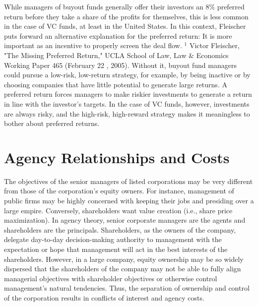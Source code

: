\documentclass[11pt]{article}
\begin{document}
While managers of buyout funds generally offer their investors an $8 \%$ preferred return before they take a share of the profits for themselves, this is less common in the case of VC funds, at least in the United States. In this context, Fleischer puts forward an alternative explanation for the preferred return: It is more important as an incentive to properly screen the deal flow. ${ }^{1}$ Victor Fleischer, "The Missing Preferred Return," UCLA School of Law, Law \& Economics Working Paper 465 (February 22 , 2005). Without it, buyout fund managers could pursue a low-risk, low-return strategy, for example, by being inactive or by choosing companies that have little potential to generate large returns. A preferred return forces managers to make riskier investments to generate a return in line with the investor's targets. In the case of VC funds, however, investments are always risky, and the high-risk, high-reward strategy makes it meaningless to bother about preferred returns.

\section*{Agency Relationships and Costs}
The objectives of the senior managers of listed corporations may be very different from those of the corporation's equity owners. For instance, management of public firms may be highly concerned with keeping their jobs and presiding over a large empire. Conversely, shareholders want value creation (i.e., share price maximization). In agency theory, senior corporate managers are the agents and shareholders are the principals. Shareholders, as the owners of the company, delegate day-to-day decision-making authority to management with the expectation or hope that management will act in the best interests of the shareholders. However, in a large company, equity ownership may be so widely dispersed that the shareholders of the company may not be able to fully align managerial objectives with shareholder objectives or otherwise control management's natural tendencies. Thus, the separation of ownership and control of the corporation results in conflicts of interest and agency costs.
\end{document}
